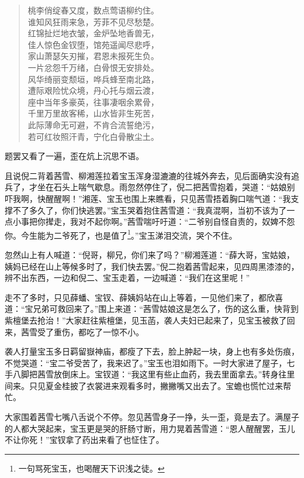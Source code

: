 \documentclass[12pt,oneside]{book}
\newenvironment{shici}{%
\begin{verse}%
\centering\large\hspace{12pt}}%
{\end{verse}}
\begin{document}
\begin{shici}
桃李俏绽春又度，数点莺语柳约住。\\
谁知风狂雨来急，芳菲不见尽愁楚。\\
红锦扯烂地衣皱，金炉坠地香兽无，\\
佳人惊色金钗堕，馆苑遥闻尽悲呼，\\
家山萧瑟矢刃摧，君恩未报死生负。\\
一片忿怨千万绪，白骨恨无安排处。\\
风华绮丽变颓垣，哗兵蜂至南北路，\\
遭际艰险忧众境，丹心托与烟云渡，\\
座中当年多豪英，往事凄咽余累骨，\\
千里万里故客稀，山水皆非生死苦，\\
此际薄命无可避，不肯合流誓绝污，\\
若可红妆照汗青，宁化白骨散尘土。
\end{shici}


题罢又看了一遍，歪在炕上沉思不语。

且说倪二背着茜雪、柳湘莲拉着宝玉浑身湿漉漉的往城外奔去，见后面确实没有追兵了，才坐在石头上喘气歇息。雨忽然停住了，倪二把茜雪抱着，哭道：“姑娘别吓我啊，快醒醒啊！”湘莲、宝玉也围上来瞧看，只见茜雪捂着胸口喘气道：“我支撑不了多久了，你们快逃罢。”宝玉哭着抱住茜雪道：“我真混啊，当初不该为了一点小事把你撵走，我对不起你啊。”茜雪喘吁吁道：“二爷别自怪自责的，奴婢不怨你。今生能为二爷死了，也是值了\footnote{一句骂死宝玉，也喝醒天下识浅之徒。}。”宝玉涕泪交流，哭个不住。

忽然山上有人喊道：“倪哥，柳兄，你们来了吗？”柳湘莲道：“薛大哥，宝姑娘，姨妈已经在山上等候多时了，我们快去罢。”倪二抱着茜雪起来，见四周黑漆漆的，辨不出东西，一边和倪二、宝玉走着，一边喊道：“我们在这里呢！”

走不了多时，只见薛蟠、宝钗、薛姨妈站在山上等着，一见他们来了，都欣喜道：“宝兄弟可救回来了。”围上来道：“茜雪姑娘这是怎么了，伤的这么重，快背到紫檀堡去抢治！”大家赶往紫檀堡，见玉菡，袭人夫妇已起来了，见宝玉被救了回来，茜雪受了重伤，都吃了一惊不小。

袭人打量宝玉多日羁留嶽神庙，都瘦了下去，脸上肿起一块，身上也有多处伤痕，不觉哭道：“宝二爷受苦了，我来迟了。”宝玉也泪如雨下。一时大家进了屋子，七手八脚把茜雪放倒床上。宝钗道：“我这里有些止血药，我去里面拿去。”转身往里间来。只见夏金桂披了衣裳进来观看多时，撇撇嘴又出去了。宝蟾也慌忙过来帮忙。

大家围着茜雪七嘴八舌说个不停。忽见茜雪身子一挣，头一歪，竟是去了。满屋子的人都大哭起来，宝玉更是哭的肝肠寸断，用力晃着茜雪道：“恩人醒醒罢，玉儿不让你死！”宝钗拿了药出来看了也怔住了。
\end{document}
